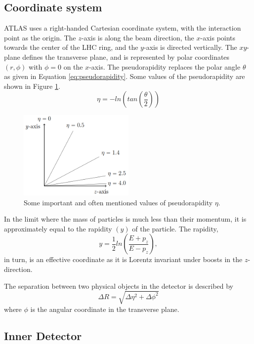\documentclass[12pt,a4paper,openright,twoside]{report}
\begin{document}
\subsection{Coordinate system}
ATLAS uses a right-handed Cartesian coordinate system, with the interaction point as the origin. The $z$-axis is along the beam direction, the $x$-axis points towards the center of the LHC ring, and the $y$-axis is directed vertically. The $xy$-plane defines the transverse plane, and is represented by polar coordinates $(r,\phi)$ with $\phi=0$ on the $x$-axis. The pseudorapidity replaces the polar angle $\theta$ as given in Equation \ref{eq:pseudorapidity}. Some values of the pseudorapidity are shown in Figure \ref{fig:eta}.
\begin{equation}
\eta = -ln\left(tan\left(\frac{\theta}{2}\right)\right)
\label{eq:pseudorapidity}
\end{equation}

\begin{figure}[h]
\centering
\includegraphics[width=0.5\textwidth]{prapidity.png}
\caption{Some important and often mentioned values of pseudorapidity $\eta$.}
\label{fig:eta}
\end{figure}

In the limit where the mass of particles is much less than their momentum, it is approximately equal to the rapidity $(y)$ of the particle. The rapidity,
\begin{equation}
y = \frac{1}{2} ln\left(\frac{E+p_z}{E-p_z}\right),
\end{equation}
in turn, is an effective coordinate as it is Lorentz invariant under boosts in the $z$-direction.

The separation between two physical objects in the detector is described by 
\begin{equation}
\Delta R = \sqrt{\Delta\eta^2 + \Delta\phi^2}
\end{equation}
where $\phi$ is the angular coordinate in the transverse plane.

\subsection{Inner Detector}
\end{document}
